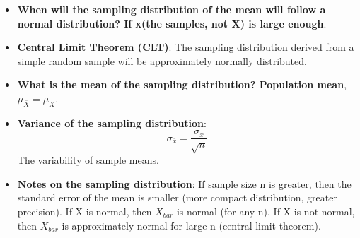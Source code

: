 \documentclass[12pt]{book}
\begin{document}
\begin{itemize}
\item \textbf{When will the sampling distribution of the mean will follow a normal distribution? If x(the samples, not X) is large enough}.
\item \textbf{Central Limit Theorem (CLT)}: The sampling distribution derived from a simple random sample will be approximately normally distributed.
\item \textbf{What is the mean of the sampling distribution? Population mean}, \textbf{$\mu_{\bar{X}} = \mu_X$}.
\item \textbf{Variance of the sampling distribution}: $$\sigma_{\bar{x}} = \frac{\sigma_x}{\sqrt{n}}$$
The variability of sample means.
\item \textbf{Notes on the sampling distribution}: If sample size n is greater, then the standard error of the mean is smaller (more compact distribution, greater precision). If X is normal, then $X_{bar}$ is normal (for any n). If X is not normal, then $X_{bar}$ is approximately normal for large n (central limit theorem).
\end{itemize}

\newpage

\graphicspath{{./regressionPic/}}
\pagestyle{fancy}
\end{document}
